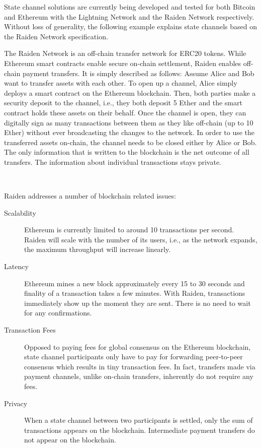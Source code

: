 State channel solutions are currently being developed and tested for both Bitcoin and Ethereum with the Lightning Network \cite{LightningNetwork} and the Raiden Network \cite{RaidenNetwork} respectively. Without loss of generality, the following example explains state channels based on the Raiden Network specification.

The Raiden Network is an off-chain transfer network for ERC20 tokens. While Ethereum smart contracts enable secure on-chain settlement, Raiden enables off-chain payment transfers. It is simply described as follows: Assume Alice and Bob want to transfer assets with each other. To open up a channel, Alice simply deploys a smart contract on the Ethereum blockchain. Then, both parties make a security deposit to the channel, i.e., they both deposit 5 Ether and the smart contract holds these assets on their behalf. Once the channel is open, they can digitally sign as many transactions between them as they like off-chain (up to 10 Ether) without ever broadcasting the changes to the network. In order to use the transferred assets on-chain, the channel needs to be closed either by Alice or Bob. The only information that is written to the blockchain is the net outcome of all transfers. The information about individual transactions stays private.
\par \

\noindent
Raiden addresses a number of blockchain related issues:

\begin{description}
  \item[Scalability] Ethereum is currently limited to around 10 transactions per second. Raiden will scale with the number of its users, i.e., as the network expands, the maximum throughput will increase linearly.
  \item[Latency] Ethereum mines a new block approximately every 15 to 30 seconds and finality of a transaction takes a few minutes. With Raiden, transactions immediately show up the moment they are sent. There is no need to wait for any confirmations.
  \item[Transaction Fees] Opposed to paying fees for global consensus on the Ethereum blockchain, state channel participants only have to pay for forwarding peer-to-peer consensus which results in tiny transaction fees. In fact, transfers made via payment channels, unlike on-chain transfers, inherently do not require any fees.
  \item[Privacy] When a state channel between two participants is settled, only the sum of transactions appears on the blockchain. Intermediate payment transfers do not appear on the blockchain.
\end{description}

